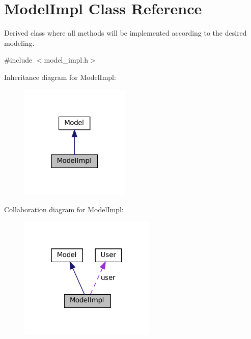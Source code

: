\hypertarget{classModelImpl}{}\section{Model\+Impl Class Reference}
\label{classModelImpl}


Derived class where all methods will be implemented according to the desired modeling.  




{\ttfamily \#include $<$model\+\_\+impl.\+h$>$}



Inheritance diagram for Model\+Impl\+:
\nopagebreak
\begin{figure}[H]
\begin{center}
\leavevmode
\includegraphics[width=148pt]{classModelImpl__inherit__graph}
\end{center}
\end{figure}


Collaboration diagram for Model\+Impl\+:
\nopagebreak
\begin{figure}[H]
\begin{center}
\leavevmode
\includegraphics[width=184pt]{classModelImpl__coll__graph}
\end{center}
\end{figure}
